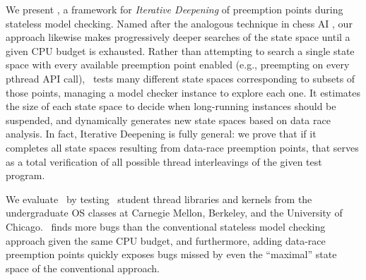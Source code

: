 
We present \quicksand, a framework for {\em Iterative Deepening} of preemption points during stateless model checking.
Named after the analogous technique in chess AI \cite{iterative-deepening-chess-ai}, our approach likewise makes progressively deeper searches of the state space until a given CPU budget is exhausted.
Rather than attempting to search a single state space with every available preemption point enabled (e.g., preempting on every pthread API call),
\quicksand~tests many different state spaces corresponding to subsets of those points, managing a model checker instance to explore each one.
It estimates the size of each state space to decide when long-running instances should be suspended, and dynamically generates new state spaces based on data race analysis.
In fact, Iterative Deepening is fully general:
we prove that if it completes all state spaces resulting from data-race preemption points,
that serves as a total verification of all possible thread interleavings of the given test program.

We evaluate \quicksand~by testing \numstudence~student thread libraries and kernels from the undergraduate OS classes at Carnegie Mellon, Berkeley, and the University of Chicago.
\quicksand~finds more bugs than the conventional stateless model checking approach given the same CPU budget,
and furthermore, adding data-race preemption points quickly exposes bugs missed by even the ``maximal'' state space of the conventional approach.

